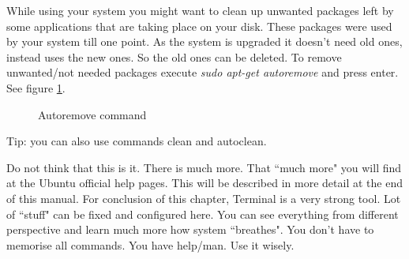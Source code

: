 \par \noindent While using your system you might want to clean up unwanted packages left by some applications that are taking place on your disk. These packages were used by your system till one point. As the system is upgraded it doesn't need old ones, instead uses the new ones. So the old ones can be deleted. To remove unwanted/not needed packages execute \textit{sudo apt-get autoremove} and press enter. See figure \ref{fig:Autoremove}. \\

\begin{figure}[h!]	
	\centering
	\caption{Autoremove command}	
	\label{fig:Autoremove}	
\end{figure}

\par \noindent Tip: you can also use commands clean and autoclean.  \\

\par \noindent Do not think that this is it. There is much more. That ``much more" you will find at the Ubuntu official help pages. This will be described in more detail at the end of this manual. For conclusion of this chapter, Terminal is a very strong tool. Lot of ``stuff" can be fixed and configured here. You can see everything from different perspective and learn much more how system ``breathes". You don't have to memorise all commands. You have help/man. Use it wisely. 
